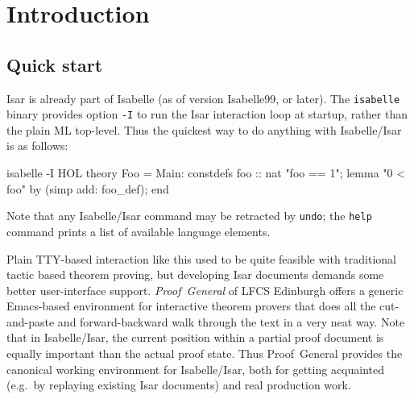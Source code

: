 
\chapter{Introduction}

\section{Quick start}

Isar is already part of Isabelle (as of version Isabelle99, or later).  The
\texttt{isabelle} binary provides option \texttt{-I} to run the Isar
interaction loop at startup, rather than the plain ML top-level.  Thus the
quickest way to do anything with Isabelle/Isar is as follows:
\begin{ttbox}
isabelle -I HOL\medskip
{}\medskip
theory Foo = Main:
constdefs foo :: nat  "foo == 1";
lemma "0 < foo" by (simp add: foo_def);
end
\end{ttbox}
Note that any Isabelle/Isar command may be retracted by \texttt{undo}; the
\texttt{help} command prints a list of available language elements.

Plain TTY-based interaction like this used to be quite feasible with
traditional tactic based theorem proving, but developing Isar documents
demands some better user-interface support.  \emph{Proof~General} of LFCS Edinburgh \cite{proofgeneral} offers a generic Emacs-based
environment for interactive theorem provers that does all the cut-and-paste
and forward-backward walk through the text in a very neat way.  Note that in
Isabelle/Isar, the current position within a partial proof document is equally
important than the actual proof state.  Thus Proof~General provides the
canonical working environment for Isabelle/Isar, both for getting acquainted
(e.g.\ by replaying existing Isar documents) and real production work.

\medskip

